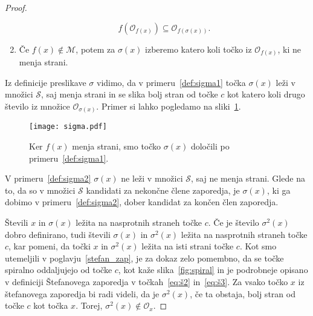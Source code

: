 \documentclass[../TG_magistrsko_delo_sections.tex]{subfiles}
\begin{document}
\begin{proof}
\begin{enumerate}[label={(\arabic*)}]
$$f(\mathcal{O}_{f(x)}) \subseteq \mathcal{O}_{f(\sigma(x))}.$$
\item\label{def:sigma2} Če $f(x) \notin \mathcal{M}$, potem za $\sigma(x)$ izberemo katero koli točko iz $\mathcal{O}_{f(x)}$, ki ne menja strani.
\end{enumerate}
Iz definicije preslikave $\sigma$ vidimo, da v primeru~\ref{def:sigma1} točka $\sigma(x)$ leži v množici $\mathcal{S}$, saj menja strani in se slika bolj stran od točke $c$ kot katero koli drugo število iz množice $\mathcal{O}_{\sigma(x)}$. Primer si lahko pogledamo na sliki~\ref{fig:sigma}.
\begin{figure}[h]
  \centering
  \texttt{[image: sigma.pdf]}
  \caption{Ker $f(x)$ menja strani, smo točko $\sigma(x)$ določili po primeru~\ref{def:sigma1}.}
  \label{fig:sigma}
\end{figure}

V primeru~\ref{def:sigma2} $\sigma(x)$ ne leži v množici $\mathcal{S}$, saj ne menja strani. Glede na to, da so v množici $\mathcal{S}$ kandidati za nekončne člene zaporedja, je $\sigma(x)$, ki ga dobimo v primeru~\ref{def:sigma2}, dober kandidat za končen člen zaporedja.

Števili $x$ in $\sigma(x)$ ležita na nasprotnih straneh točke $c$. Če je število $\sigma^2(x)$ dobro definirano, tudi števili $\sigma(x)$ in $\sigma^2(x)$ ležita na nasprotnih straneh točke $c$, kar pomeni, da točki $x$ in $\sigma^2(x)$ ležita na isti strani točke $c$. Kot smo utemeljili v poglavju~\ref{stefan_zap}, je za dokaz zelo pomembno, da se točke spiralno oddaljujejo od točke $c$, kot kaže slika~\ref{fig:spiral} in je podrobneje opisano v definiciji Štefanovega zaporedja v točkah~\ref{eq:š2} in~\ref{eq:š3}. Za vsako točko $x$ iz štefanovega zaporedja bi radi videli, da je $\sigma^2(x)$, če ta obstaja, bolj stran od točke $c$ kot točka $x$. Torej, $\sigma^2(x) \notin \mathcal{O}_x$.



\end{proof}
\end{document}
